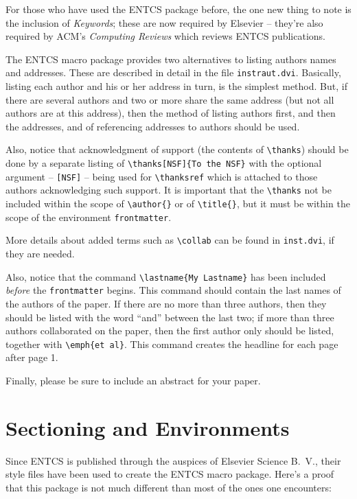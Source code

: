 \documentclass{entcs} \usepackage{entcsmacro}
\def\lastname{Please list Your Lastname Here}
\begin{document}
For those who have used the ENTCS package before, the one new thing to
note is the inclusion of \emph{Keywords}; these are now required by
Elsevier -- they're also required by ACM's \emph{Computing Reviews}
which reviews ENTCS publications.

The ENTCS macro package provides two alternatives to listing authors
names and addresses.  These are described in detail in the file
\texttt{instraut.dvi}. Basically, listing each author and his or her
address in turn, is the simplest method.  But, if there are several
authors and two or more share the same address (but not all authors
are at this address), then the method of listing authors first, and
then the addresses, and of referencing addresses to authors should be
used.

Also, notice that acknowledgment of support (the contents of
\verb+\thanks+) should be done by a separate listing of
\verb+\thanks[NSF]{To the NSF}+ with the optional argument --
\verb+[NSF]+ -- being used for \verb+\thanksref+ which is attached to
those authors acknowledging such support.  It is important that the
\verb+\thanks+ not be included within the scope of \verb+\author{}+ or
of \verb+\title{}+, but it must be within the scope of the environment
\texttt{frontmatter}.

More details about added terms such as \verb+\collab+ can be
found in \texttt{inst.dvi}, if they are needed.

Also, notice that the command \verb+\lastname{My Lastname}+ has been
included \emph{before} the \texttt{frontmatter} begins.  This command
should contain the last names of the authors of the paper.  If there
are no more than three authors, then they should be listed with the
word ``and'' between the last two; if more than three authors
collaborated on the paper, then the first author only should be
listed, together with \verb+\emph{et al}+.  This command creates the
headline for each page after page 1.

Finally, please be sure to include an abstract for your paper.

\section{Sectioning and Environments}
Since ENTCS is published through the auspices of Elsevier Science
B.~V., their style files have been used to create the ENTCS macro
package.  Here's a proof that this package is not much different than
most of the ones one encounters:
\end{document}
